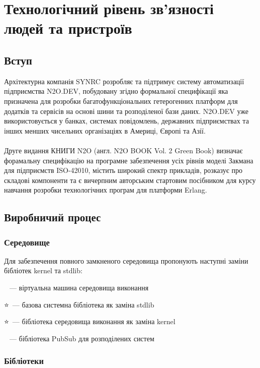 \chapter{Технологічний рівень зв'язності людей та пристроїв}

\section{Вступ}

Архітектурна компанія SYNRC розробляє та підтримує систему автоматизації підприємства N2O.DEV,
побудовану згідно формальної специфікації яка призначена для розробки багатофункціональних
гетерогенних платформ для додатків та сервісів на основі шини та розподіленої бази даних.
N2O.DEV уже використовується у банках, системах повідомлень, державних підприємствах та
інших менших чисельних організаціях в Америці, Європі та Азії.
\\
\\
Друге видання КНИГИ N2O (англ. N2O BOOK Vol. 2 Green Book) визначає форамальну специфікацію
на програмне забезпечення усіх рівнів моделі Закмана для підприємств ISO-42010, містить
широкий спектр прикладів, розказує про складові компоненти та є вичерпним авторським
стартовим посібником для курсу навчання розробки технологічних програм для платформи Erlang.

\section{Виробничий процес}

\subsection{Середовище}

Для забезпечення повного замкненого середовища пропонують наступні заміни бібліотек kernel та stdlib:

\setmainfont{Segoe UI Emoji}🚀\setmainfont{Geometria}\ --- віртуальна машина середовища виконання

\setmainfont{Segoe UI Emoji}⭐\setmainfont{Geometria}\ --- базова системна бібліотека як заміна stdlib

\setmainfont{Segoe UI Emoji}⭐\setmainfont{Geometria}\ --- бібліотека середовища виконання як заміна kernel

\setmainfont{Segoe UI Emoji}📨\setmainfont{Geometria}\ --- бібліотека PubSub для розподілених систем


\newpage
\subsection{Бібліотеки}

